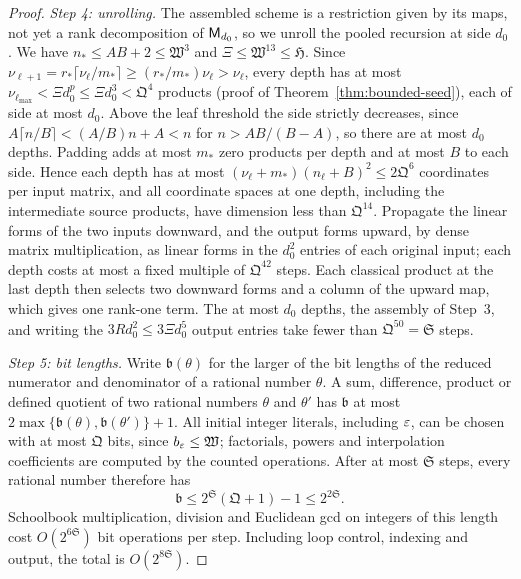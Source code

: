 \begin{proof}
\emph{Step 4: unrolling.} The assembled scheme is a restriction given
by its maps, not yet a rank decomposition of \(\mathsf M_{d_0}\), so we unroll
the pooled recursion at side \(d_0\). We have
\(n_*\le AB+2\le\mathfrak W^3\) and
\(\Xi\le\mathfrak W^{13}\le\mathfrak H\). Since
\(\nu_{\ell+1}=r_*\lceil\nu_\ell/m_*\rceil
\ge(r_*/m_*)\nu_\ell>\nu_\ell\), every depth has at most
\(\nu_{\ell_{\max}}<\Xi d_0^p\le\Xi d_0^3<\mathfrak Q^4\) products (proof
of Theorem~\ref{thm:bounded-seed}), each of side at most \(d_0\). Above
the leaf threshold the side strictly decreases, since
\(A\lceil n/B\rceil<(A/B)n+A<n\) for \(n>AB/(B-A)\), so there are at most
\(d_0\) depths. Padding adds at most \(m_*\) zero products per depth and
at most \(B\) to each side. Hence each depth has at most
\((\nu_\ell+m_*)(n_\ell+B)^2\le2\mathfrak Q^6\) coordinates per input
matrix, and all coordinate spaces at one depth, including the
intermediate source products, have dimension less than
\(\mathfrak Q^{14}\). Propagate the linear forms of the two inputs
downward, and the output forms upward, by dense matrix multiplication,
as linear forms in the \(d_0^2\) entries of each original input; each
depth costs at most a fixed multiple of \(\mathfrak Q^{42}\) steps. Each
classical product at the last depth then selects two downward forms and
a column of the upward map, which gives one rank-one term. The at most
\(d_0\) depths, the assembly of Step~3, and writing the
\(3Rd_0^2\le3\Xi d_0^5\) output entries take fewer than
\(\mathfrak Q^{50}=\mathfrak S\) steps.

\emph{Step 5: bit lengths.} Write \(\mathfrak b(\theta)\) for the
larger of the bit lengths of the reduced numerator and denominator of a
rational number \(\theta\). A sum, difference, product or defined
quotient of two rational numbers \(\theta\) and \(\theta'\) has
\(\mathfrak b\) at most
\(2\max\{\mathfrak b(\theta),\mathfrak b(\theta')\}+1\). All
initial integer literals, including \(\varepsilon\), can be chosen with at most
\(\mathfrak Q\) bits, since \(b_\varepsilon\le\mathfrak W\);
factorials, powers and interpolation coefficients are computed by the
counted operations. After at most \(\mathfrak S\) steps, every rational
number therefore has
\[
 \mathfrak b\le2^{\mathfrak S}(\mathfrak Q+1)-1\le2^{2\mathfrak S}.
\]
Schoolbook multiplication, division and Euclidean gcd on integers of
this length cost \(O(2^{6\mathfrak S})\) bit operations per step.
Including loop control, indexing and output, the total is
\(O(2^{8\mathfrak S})\).
\end{proof}
